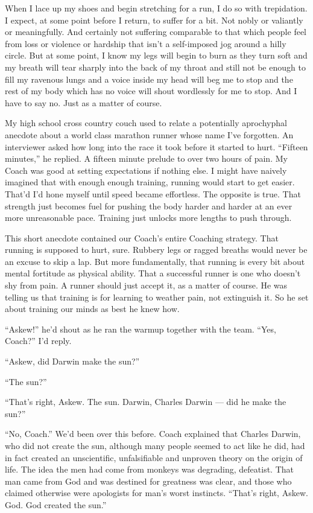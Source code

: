 \documentclass[14pt, oneside]{memoir}
\begin{document}
When I lace up my shoes and begin stretching for a run, I do so with
trepidation.
I expect, at some point before I return, to suffer for a bit.
Not nobly or valiantly or meaningfully.
And certainly not suffering comparable to that which people feel from
loss or violence or hardship that isn't a self-imposed jog around a
hilly circle.
But at some point, I know my legs will begin to burn as they turn
soft and my breath will tear sharply into the back of my throat and
still not be enough to fill my ravenous lungs and a voice inside my
head will beg me to stop and the rest of my body which has no voice
will shout wordlessly for me to stop.
And I have to say no.
Just as a matter of course.

My high school cross country couch used to relate a potentially
aprochyphal anecdote about a world class marathon runner whose name
I've forgotten.
An interviewer asked how long into the race it took before it started
to hurt.
``Fifteen minutes,'' he replied.
A fifteen minute prelude to over two hours of pain.
My Coach was good at setting expectations if nothing else.
I might have naively imagined that with enough enough training,
running would start to get easier.
That'd I'd hone myself until speed became effortless.
The opposite is true.
That strength just becomes fuel for pushing the body harder and harder
at an ever more unreasonable pace.
Training just unlocks more lengths to push through.

This short anecdote contained our Coach's entire Coaching strategy.
That running is supposed to hurt, sure.
Rubbery legs or ragged breaths would never be an excuse to skip a lap.
But more fundamentally, that running is every bit about mental
fortitude as physical ability.
That a successful runner is one who doesn't shy from pain.
A runner should just accept it, as a matter of course.
He was telling us that training is for learning to weather pain, not
extinguish it.
So he set about training our minds as best he knew how.

``Askew!'' he'd shout as he ran the warmup together with the team.
``Yes, Coach?'' I'd reply.

``Askew, did Darwin make the sun?''

``The sun?''

``That's right, Askew. The sun. Darwin, Charles Darwin --- did he make
the sun?''

``No, Coach.'' We'd been over this before.
Coach explained that Charles Darwin, who did not create the sun,
although many people seemed to act like he did, had in fact created an
unscientific, unfalsifiable and unproven theory on the origin of life.
The idea the men had come from monkeys was degrading, defeatist.
That man came from God and was destined for greatness was clear, and
those who claimed otherwise were apologists for man's worst instincts.
``That's right, Askew. God. God created the sun.''
\end{document}
